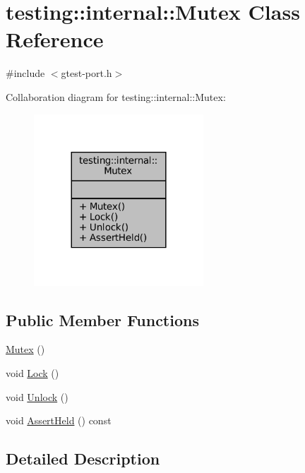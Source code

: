 \hypertarget{classtesting_1_1internal_1_1Mutex}{}\section{testing\+:\+:internal\+:\+:Mutex Class Reference}
\label{classtesting_1_1internal_1_1Mutex}


{\ttfamily \#include $<$gtest-\/port.\+h$>$}



Collaboration diagram for testing\+:\+:internal\+:\+:Mutex\+:
\nopagebreak
\begin{figure}[H]
\begin{center}
\leavevmode
\includegraphics[width=180pt]{classtesting_1_1internal_1_1Mutex__coll__graph}
\end{center}
\end{figure}
\subsection*{Public Member Functions}
\begin{DoxyCompactItemize}
\item 
\hyperlink{classtesting_1_1internal_1_1Mutex_a38e1833a78e3eec81ad23ce1b056b40e}{Mutex} ()
\item 
void \hyperlink{classtesting_1_1internal_1_1Mutex_ae7e2191886c00182176b23c4f4d049f8}{Lock} ()
\item 
void \hyperlink{classtesting_1_1internal_1_1Mutex_a315188055de1be98884519ad84eff2e6}{Unlock} ()
\item 
void \hyperlink{classtesting_1_1internal_1_1Mutex_af45bf1660ac4110338a02a8680b2f486}{Assert\+Held} () const
\end{DoxyCompactItemize}


\subsection{Detailed Description}


